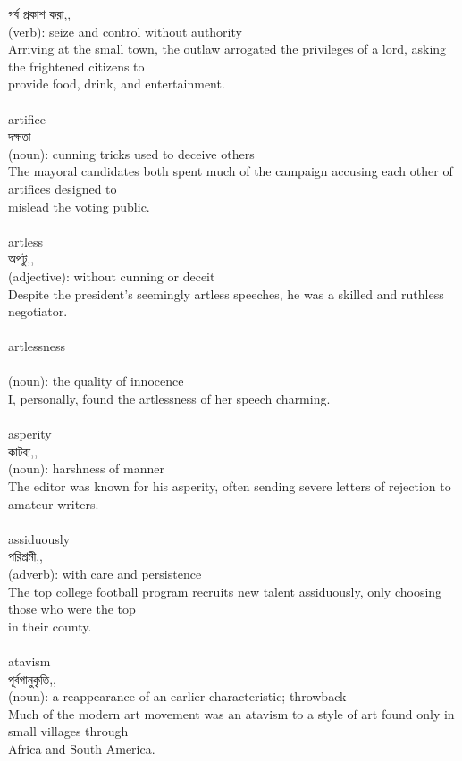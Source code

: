 \documentclass{article}
\begin{document}
{গর্ব প্রকাশ করা,,}\\
{(verb): seize and control without authority\\Arriving at the small town, the outlaw arrogated the privileges of a lord, asking the frightened citizens to\\provide food, drink, and entertainment.\\}\\
{artifice}\\
{দক্ষতা}\\
{(noun): cunning tricks used to deceive others\\The mayoral candidates both spent much of the campaign accusing each other of artifices designed to\\mislead the voting public.\\}\\
{artless}\\
{অপটু,,}\\
{(adjective): without cunning or deceit\\Despite the president's seemingly artless speeches, he was a skilled and ruthless negotiator.\\}\\
{artlessness}\\
{}\\
{(noun): the quality of innocence\\I, personally, found the artlessness of her speech charming.\\}\\
{asperity}\\
{কাটব্য,,}\\
{(noun): harshness of manner\\The editor was known for his asperity, often sending severe letters of rejection to amateur writers.\\}\\
{assiduously}\\
{পরিশ্রমী,,}\\
{(adverb): with care and persistence\\The top college football program recruits new talent assiduously, only choosing those who were the top\\in their county.\\}\\
{atavism}\\
{পূর্বগানুকৃতি,,}\\
{(noun): a reappearance of an earlier characteristic; throwback\\Much of the modern art movement was an atavism to a style of art found only in small villages through\\Africa and South America.\\}\\
\end{document}
